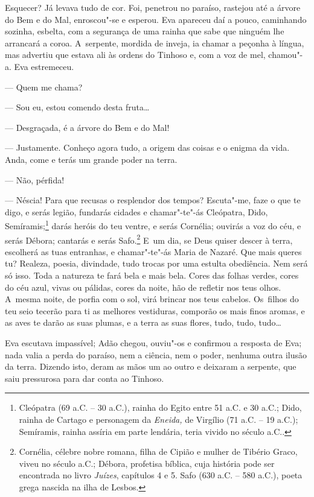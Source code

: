 \begin{linenumbers}
Esquecer? Já levava tudo de cor. Foi, penetrou no paraíso, rastejou até
a árvore do Bem e do Mal, enroscou"-se e esperou. Eva apareceu daí a
pouco, caminhando sozinha, esbelta, com a segurança de uma rainha que
sabe que ninguém lhe arrancará a coroa. A~serpente, mordida de inveja,
ia chamar a peçonha à língua, mas advertiu que estava ali às ordens do
Tinhoso e, com a voz de mel, chamou"-a. Eva estremeceu.

--- Quem me chama?

--- Sou eu, estou comendo desta fruta\ldots{}

--- Desgraçada, é a árvore do Bem e do Mal!

--- Justamente. Conheço agora tudo, a origem das coisas e o enigma da
vida. Anda, come e terás um grande poder na terra.

--- Não, pérfida!

--- Néscia! Para que recusas o resplendor dos tempos? Escuta"-me, faze o
que te digo, e serás legião, fundarás cidades e chamar"-te"-ás Cleópatra,
Dido, Semíramis;\footnote{Cleópatra (69 a.C. -- 30 a.C.), rainha do Egito
  entre 51 a.C. e 30 a.C.; Dido, rainha de Cartago e personagem da
  \emph{Eneida,} de Virgílio (71 a.C. -- 19 a.C.); Semíramis, rainha
  assíria em parte lendária, teria vivido no século  a.C..} darás
heróis do teu ventre, e serás Cornélia; ouvirás a voz do céu, e serás
Débora; cantarás e serás Safo.\footnote{Cornélia, célebre nobre romana,
  filha de Cipião e mulher de Tibério Graco, viveu no século  a.C.;
  Débora, profetisa bíblica, cuja história pode ser encontrada no livro
  \emph{Juízes}, capítulos 4 e 5. Safo (630 a.C. -- 580 a.C.), poeta
  grega nascida na ilha de Lesbos.} E~um dia, se Deus quiser descer à
terra, escolherá as tuas entranhas, e chamar"-te"-ás Maria de Nazaré. Que
mais queres tu? Realeza, poesia, divindade, tudo trocas por uma estulta
obediência. Nem será só isso. Toda a natureza te fará bela e mais bela.
Cores das folhas verdes, cores do céu azul, vivas ou pálidas, cores da
noite, hão de refletir nos teus olhos. A~mesma noite, de porfia com o
sol, virá brincar nos teus cabelos. Os~filhos do teu seio tecerão para
ti as melhores vestiduras, comporão os mais finos aromas, e as aves te
darão as suas plumas, e a terra as suas flores, tudo, tudo, tudo\ldots{}

Eva escutava impassível; Adão chegou, ouviu"-os e confirmou a resposta de
Eva; nada valia a perda do paraíso, nem a ciência, nem o poder, nenhuma
outra ilusão da terra. Dizendo isto, deram as mãos um ao outro e
deixaram a serpente, que saiu pressurosa para dar conta ao Tinhoso.


\end{linenumbers}
